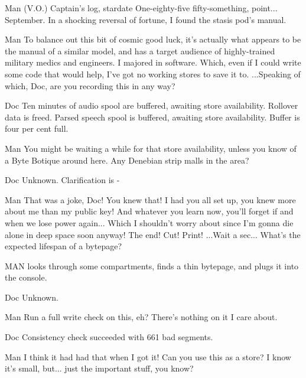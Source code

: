 \documentclass{screenplay}
\begin{document}
\begin{dialogue}{Man (V.O.)}
Captain's log, stardate One-eighty-five fifty-something, point... September.  In a shocking reversal of fortune, I found the stasis pod's manual.
\end{dialogue}
\begin{dialogue}[cont.]{Man}
To balance out this bit of cosmic good luck, it's actually what appears to be the manual of a similar model, and has a target audience of highly-trained military medics and engineers.  I majored in software.  Which, even if I could write some code that would help, I've got no working stores to save it to.  ...Speaking of which, Doc, are you recording this in any way?
\end{dialogue}
\begin{dialogue}{Doc}
Ten minutes of audio spool are buffered, awaiting store availability.  Rollover data is freed.  Parsed speech spool is buffered, awaiting store availability.  Buffer is four per cent full.
\end{dialogue}
\begin{dialogue}{Man}
You might be waiting a while for that store availability, unless you know of a Byte Botique around here.  Any Denebian strip malls in the area?
\end{dialogue}
\begin{dialogue}{Doc}
Unknown.  Clarification is -
\end{dialogue}
\begin{dialogue}[frustrated]{Man}
That was a joke, Doc!  You knew that!  I had you all set up, you knew more about me than my public key!  And whatever you learn now, you'll forget if and when we lose power again...  Which I shouldn't worry about since I'm gonna die alone in deep space soon anyway!  The end!  Cut!  Print!  ...Wait a sec...  What's the expected lifespan of a bytepage?
\end{dialogue}
MAN looks through some compartments, finds a thin bytepage, and plugs it into the console.
\begin{dialogue}{Doc}
Unknown.
\end{dialogue}
\begin{dialogue}{Man}
Run a full write check on this, eh?  There's nothing on it I care about.
\end{dialogue}
\begin{dialogue}{Doc}
Consistency check succeeded with 661 bad segments.
\end{dialogue}
\begin{dialogue}{Man}
I think it had had that when I got it!  Can you use this as a store?  I know it's small, but... just the important stuff, you know?
\end{dialogue}
\end{document}
